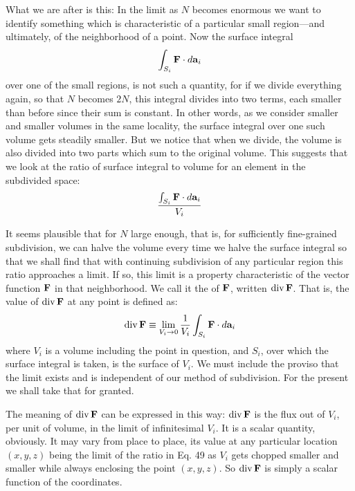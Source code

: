 What we are after is this: In the limit as $N$ becomes enormous we
want to identify something which is characteristic of a particular
small region---and ultimately, of the neighborhood of a point. Now
the surface integral
\begin{equation}
  \int_{S_i} \mathbf{F}\cdot\mathop{d\!} \mathbf{a}_i
\end{equation}
over one of the small regions, is not such a quantity, for if we divide
everything again, so that $N$ becomes $2N$, this integral divides into two
terms, each smaller than before since their sum is constant. In other
words, as we consider smaller and smaller volumes in the same
locality, the surface integral over one such volume gets steadily
smaller. But we notice that when we divide, the volume is also
divided into two parts which sum to the original volume. This suggests
that we look at the ratio of surface integral to volume for an
element in the subdivided space:
\begin{equation}
  \frac{\int_{S_i} \mathbf{F}\cdot\mathop{d\!} \mathbf{a}_i}{V_i}
\end{equation}


It seems plausible that for $N$ large enough, that is, for sufficiently
fine-grained subdivision, we can halve the volume every time we
halve the surface integral so that we shall find that with continuing
subdivision of any particular region this ratio approaches a limit. If
so, this limit is a property characteristic of the vector function $\mathbf{F}$ in
that neighborhood. We call it the  of $\mathbf{F}$, written $\operatorname{div}\mathbf{F}$.
That is, the value of $\operatorname{div}\mathbf{F}$ at any point is defined as:
\begin{equation}
  \operatorname{div}\mathbf{F}\equiv \lim_{V_i\rightarrow0} \frac{1}{V_i} \int_{S_i} \mathbf{F}\cdot\mathop{d\!} \mathbf{a}_i
\end{equation}
where $V_i$ is a volume including the point in question, and $S_i$, over
which the surface integral is taken, is the surface of $V_i$. We must include
the proviso that the limit exists and is independent of our
method of subdivision. For the present we shall take that for
granted.

The meaning of $\operatorname{div}\mathbf{F}$ can be expressed in this way: $\operatorname{div}\mathbf{F}$ is the
flux out of $V_i$, per unit of volume, in the limit of infinitesimal $V_i$. It
is a scalar quantity, obviously. It may vary from place to place, its
value at any particular location $(x,y,z)$ being the limit of the ratio in
Eq. 49 as $V_i$ gets chopped smaller and smaller while always enclosing
the point $(x,y,z)$. So $\operatorname{div}\mathbf{F}$ is simply a scalar function of the
coordinates.


